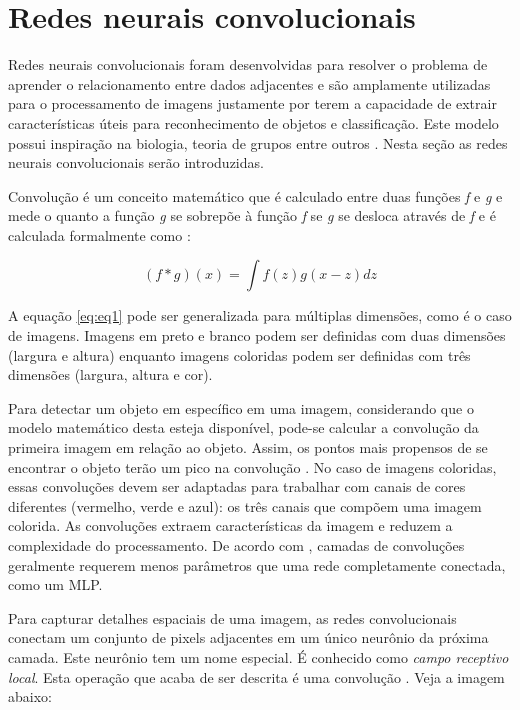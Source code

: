 \section{Redes neurais convolucionais}
\label{sec:cnn}

Redes neurais convolucionais foram desenvolvidas para resolver o problema de aprender o relacionamento entre dados adjacentes e são amplamente utilizadas para o processamento de imagens justamente por terem a capacidade de extrair características úteis para reconhecimento de objetos e classificação. Este modelo possui inspiração na biologia, teoria de grupos entre outros \cite{zhang_dive_2021}. Nesta seção as redes neurais convolucionais serão introduzidas.

Convolução é um conceito matemático que é calculado entre duas funções \textit{f} e \textit{g} e mede o quanto a função \textit{g} se sobrepõe à função \textit{f} se \textit{g} se desloca através de \textit{f} e é calculada formalmente como \cite{wikipedia_convolucao_2020, weisstein_convolution_2003, zhang_dive_2021}:

\begin{equation}
    (f * g)(x) = \int f(z)g(x-z)dz
    \label{eq:eq1}
\end{equation}

A equação \ref{eq:eq1} pode ser generalizada para múltiplas dimensões, como é o caso de imagens. Imagens em preto e branco podem ser definidas com duas dimensões (largura e altura) enquanto imagens coloridas podem ser definidas com três dimensões (largura, altura e cor). 

Para detectar um objeto em específico em uma imagem, considerando que o modelo matemático desta esteja disponível, pode-se calcular a convolução da primeira imagem em relação ao objeto. Assim, os pontos mais propensos de se encontrar o objeto terão um pico na convolução \cite{zhang_dive_2021}. No caso de imagens coloridas, essas convoluções devem ser adaptadas para trabalhar com canais de cores diferentes (vermelho, verde e azul): os três canais que compõem uma imagem colorida. As convoluções extraem características da imagem e reduzem a complexidade do processamento. De acordo com , camadas de convoluções geralmente requerem menos parâmetros que uma rede completamente conectada, como um MLP.  

Para capturar detalhes espaciais de uma imagem, as redes convolucionais conectam um conjunto de pixels adjacentes em um único neurônio da próxima camada. Este neurônio tem um nome especial. É conhecido como \textit{campo receptivo local}. Esta operação que acaba de ser descrita é uma convolução \cite{gulli_deep_2019}. Veja a imagem abaixo:


